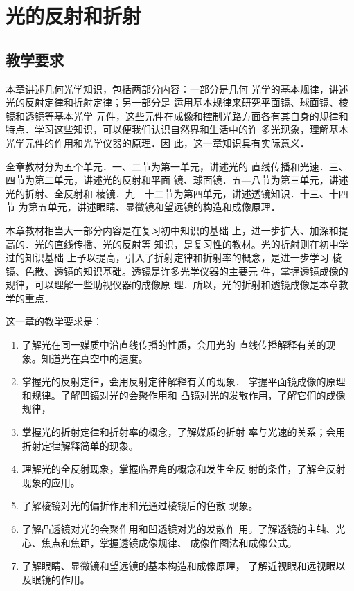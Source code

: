 \chapter{光的反射和折射}
\minitoc[n]
\section{教学要求}
    本章讲述几何光学知识，包括两部分内容：一部分是几何
光学的基本规律，讲述光的反射定律和折射定律；另一部分是
运用基本规律来研究平面镜、球面镜、棱镜和透镜等基本光学
元件，这些元件在成像和控制光路方面各有其自身的规律和
特点．学习这些知识，可以便我们认识自然界和生活中的许
多光现象，理解基本光学元件的作用和光学仪器的原理．因
此，这一章知识具有实际意义．

全章教材分为五个单元．一、二节为第一单元，讲述光的
直线传播和光速．三、四节为第二单元，讲述光的反射和平面
镜、球面镜．五—八节为第三单元，讲述光的折射、全反射和
棱镜．九—十二节为第四单元，讲述透镜知识．十三、十四节
为第五单元，讲述眼睛、显微镜和望远镜的构造和成像原理．

本章教材相当大一部分内容是在复习初中知识的基础
上，进一步扩大、加深和提高的．光的直线传播、光的反射等
知识，是复习性的教材。光的折射则在初中学过的知识基础
上予以提高，引入了折射定律和折射率的概念，是进一步学习
棱镜、色散、透镜的知识基础。透镜是许多光学仪器的主要元
件，掌握透镜成像的规律，可以理解一些助视仪器的成像原
理．所以，光的折射和透镜成像是本章教学的重点．

这一章的教学要求是：
\begin{enumerate}
\item 了解光在同一媒质中沿直线传播的性质，会用光的
直线传播解释有关的现象。知道光在真空中的速度。
\item 掌握光的反射定律，会用反射定律解释有关的现象．
掌握平面镜成像的原理和规律。了解凹镜对光的会聚作用和
凸镜对光的发散作用，了解它们的成像规律，
\item 掌握光的折射定律和折射率的概念，了解媒质的折射
率与光速的关系；会用折射定律解释简单的现象。
\item 理解光的全反射现象，掌握临界角的概念和发生全反
射的条件，了解全反射现象的应用。
\item 了解棱镜对光的偏折作用和光通过棱镜后的色散
现象。
\item 了解凸透镜对光的会聚作用和凹透镜对光的发散作
用。了解透镜的主轴、光心、焦点和焦距，掌握透镜成像规律、
成像作图法和成像公式。
\item 了解眼睛、显微镜和望远镜的基本构造和成像原理，
了解近视眼和远视眼以及眼镜的作用。
\end{enumerate}

